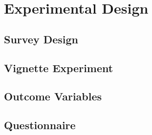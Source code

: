 \section{Experimental Design}

\subsection{Survey Design}

\subsection{Vignette Experiment}

\subsection{Outcome Variables}

\subsection{Questionnaire}